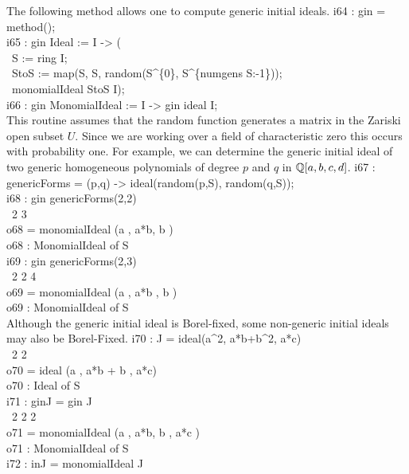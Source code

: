 The following method allows one to compute generic initial ideals.
\beginOutput
i64 : gin = method();\\
\endOutput
\beginOutput
i65 : gin Ideal := I -> (\\
\           S := ring I;\\
\           StoS := map(S, S, random(S^\{0\}, S^\{numgens S:-1\}));\\
\           monomialIdeal StoS I);\\
\endOutput
\beginOutput
i66 : gin MonomialIdeal := I -> gin ideal I;\\
\endOutput
This routine assumes that the random function generates a matrix in
the Zariski open subset $U$.  Since we are working over a field of
characteristic zero this occurs with probability one.
For example, we can determine the generic initial ideal of two generic
homogeneous polynomials of degree $p$ and $q$ in ${\mathbb Q}[a,b,c,d]$.
\beginOutput
i67 : genericForms = (p,q) -> ideal(random(p,S), random(q,S));\\
\endOutput
\beginOutput
i68 : gin genericForms(2,2)\\
\emptyLine
\                      2        3\\
o68 = monomialIdeal (a , a*b, b )\\
\emptyLine
o68 : MonomialIdeal of S\\
\endOutput
\beginOutput
i69 : gin genericForms(2,3)\\
\emptyLine
\                      2     2   4\\
o69 = monomialIdeal (a , a*b , b )\\
\emptyLine
o69 : MonomialIdeal of S\\
\endOutput
Although the generic initial ideal is Borel-fixed, some non-generic
initial ideals may also be Borel-Fixed.
\beginOutput
i70 : J = ideal(a^2, a*b+b^2, a*c)\\
\emptyLine
\              2         2\\
o70 = ideal (a , a*b + b , a*c)\\
\emptyLine
o70 : Ideal of S\\
\endOutput
\beginOutput
i71 : ginJ = gin J\\
\emptyLine
\                      2        2     2\\
o71 = monomialIdeal (a , a*b, b , a*c )\\
\emptyLine
o71 : MonomialIdeal of S\\
\endOutput
\beginOutput
i72 : inJ = monomialIdeal J\\
\emptyLine
